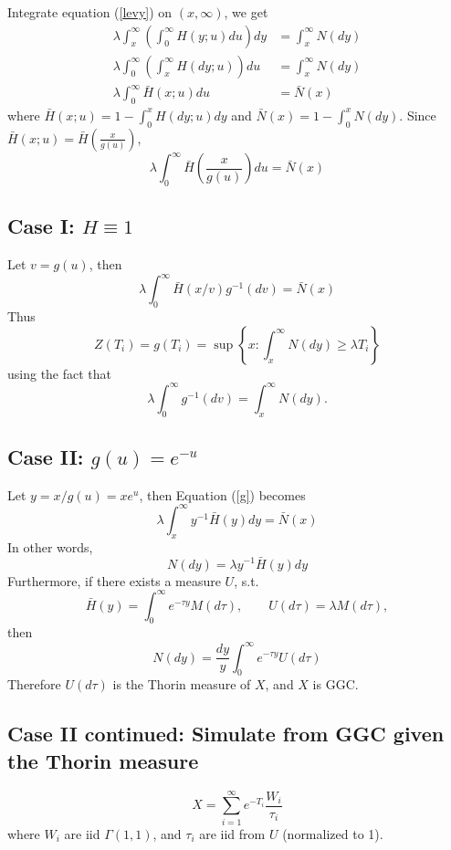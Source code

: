 \documentclass[11pt, oneside]{article}
\begin{document}
Integrate equation (\ref{levy}) on $(x, \infty)$, we get
\begin{align}
\lambda \int_x^\infty \left(\int_0^\infty  H(y; u) du\right) dy &= \int_x^\infty N(dy)\\
\lambda  \int_0^\infty \left(\int_x^\infty  H(dy; u) \right) du &= \int_x^\infty N(dy)\\
\lambda  \int_0^\infty \bar H(x; u) du &= \bar N(x)
\end{align}
where $\bar H(x; u) = 1 - \int_0^x H(dy; u) dy$ and $\bar N(x) = 1- \int_0^x N(dy)$. Since $\bar H(x; u) = \bar H\left(\frac{x}{g(u)}\right)$,
\begin{equation}\label{g}
\lambda \int_0^\infty \bar H\left(\frac{x}{g(u)}\right) du = \bar N(x)
\end{equation}

\subsection{Case I: $H \equiv 1$}
Let $v = g(u)$, then
\begin{equation}
\lambda \int_0^\infty\bar H(x/v)g^{-1}(dv) = \bar N(x)
\end{equation}
Thus 
$$
Z(T_i) = g(T_i) = \sup\left\{x: \int_x^\infty N(dy) \geq \lambda T_i\right\}
$$
using the fact that 
$$
\lambda \int_0^\infty g^{-1}(dv)  = \int_x^\infty N(dy).
$$
\subsection{Case II: $g(u) = e^{-u}$}
Let $y = x/g(u) = xe^u$, then  Equation (\ref{g}) becomes
\begin{equation}
\lambda \int_x^\infty y^{-1}\bar H(y) dy= \bar N(x)
\end{equation}
In other words,
$$
N(dy) = \lambda y^{-1}\bar H(y) dy
$$
Furthermore, if there exists a measure $U$, s.t. 
$$
\bar H(y) = \int_0^\infty e^{-\tau y} M(d \tau), \qquad U(d \tau) = \lambda  M(d \tau),
$$
then 
\begin{equation}
N(dy) = \frac{dy}{y}\int_0^\infty e^{-\tau y} U(d \tau)
\end{equation}
Therefore $U(d\tau)$ is the Thorin measure of $X$, and $X$ is GGC.
\subsection{Case II continued: Simulate from GGC given the Thorin measure}
$$
X = \sum_{i=1}^\infty e^{-T_i} \frac{W_i}{\tau_i}
$$
where $W_i$ are iid $\Gamma(1,1)$, and $\tau_i$ are iid from $U$ (normalized to 1).
\end{document}
